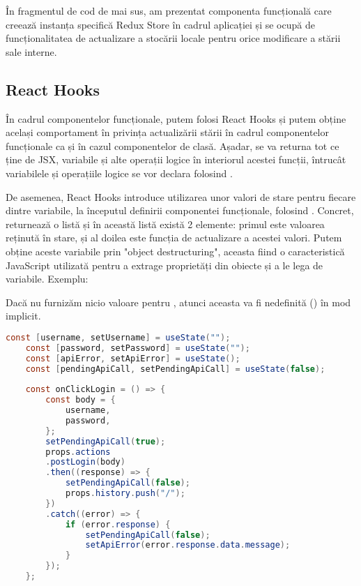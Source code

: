 În fragmentul de cod de mai sus, am prezentat componenta funcțională  care creează instanța specifică Redux Store în cadrul aplicației și se ocupă de funcționalitatea de actualizare a stocării locale pentru orice modificare a stării sale interne.\newline

\subsection{React Hooks}

În cadrul componentelor funcționale, putem folosi React Hooks\cite{.reacthooks} și putem obține același comportament în privința actualizării stării în cadrul componentelor funcționale ca și în cazul componentelor de clasă. Așadar, se va returna tot ce ține de JSX, variabile și alte operații logice în interiorul acestei funcții, întrucât variabilele și operațiile logice se vor declara folosind .\newline

De asemenea, React Hooks introduce utilizarea unor valori de stare pentru fiecare dintre variabile, la începutul definirii componentei funcționale, folosind .\newline
Concret,  returnează o listă și în această listă există 2 elemente: primul este valoarea reținută în stare, și al doilea este funcția de actualizare a acestei valori. Putem obține aceste variabile prin "object destructuring", aceasta fiind o caracteristică JavaScript utilizată pentru a extrage proprietăți din obiecte și a le lega de variabile.\newline
Exemplu: \newline

Dacă nu furnizăm nicio valoare pentru , atunci aceasta va fi nedefinită () în mod implicit.\newline

\begin{lstlisting}[language=Java]
	const [username, setUsername] = useState("");
	const [password, setPassword] = useState("");
	const [apiError, setApiError] = useState();
	const [pendingApiCall, setPendingApiCall] = useState(false);
	
	const onClickLogin = () => {
		const body = {
			username,
			password,
		};
		setPendingApiCall(true);
		props.actions
		.postLogin(body)
		.then((response) => {
			setPendingApiCall(false);
			props.history.push("/");
		})
		.catch((error) => {
			if (error.response) {
				setPendingApiCall(false);
				setApiError(error.response.data.message);
			}
		});
	};
\end{lstlisting}
\bigskip

